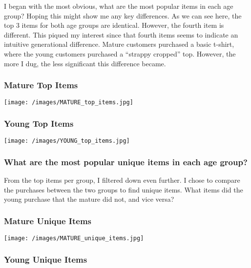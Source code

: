 \documentclass[
]{article}
\begin{document}
I began with the most obvious, what are the most popular items in each
age group? Hoping this might show me any key differences. As we can see
here, the top 3 items for both age groups are identical. However, the
fourth item is different. This piqued my interest since that fourth
items seems to indicate an intuitive generational difference. Mature
customers purchased a basic t-shirt, where the young customers purchased
a ``strappy cropped'' top. However, the more I dug, the less significant
this difference became.

\hypertarget{mature-top-items}{%
\subsubsection{Mature Top Items}\label{mature-top-items}}

\texttt{[image: /images/MATURE\_top\_items.jpg]}

\hypertarget{young-top-items}{%
\subsubsection{Young Top Items}\label{young-top-items}}

\texttt{[image: /images/YOUNG\_top\_items.jpg]}

\hypertarget{what-are-the-most-popular-unique-items-in-each-age-group}{%
\subsubsection{What are the most popular unique items in each age
group?}\label{what-are-the-most-popular-unique-items-in-each-age-group}}

From the top items per group, I filtered down even further. I chose to
compare the purchases between the two groups to find unique items. What
items did the young purchase that the mature did not, and vice versa?

\hypertarget{mature-unique-items}{%
\subsubsection{Mature Unique Items}\label{mature-unique-items}}

\texttt{[image: /images/MATURE\_unique\_items.jpg]}

\hypertarget{young-unique-items}{%
\subsubsection{Young Unique Items}\label{young-unique-items}}
\end{document}
